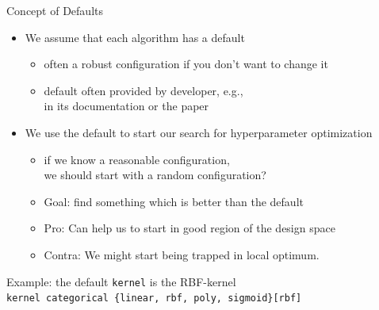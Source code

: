 \begin{frame}[c]{Concept of Defaults}

\begin{itemize}
  \item We assume that each algorithm has a default
  \begin{itemize}
    \item often a robust configuration if you don't want to change it
    \item default often provided by developer, e.g.,\\
   		  in its documentation or the paper
  \end{itemize}
  \pause
  \item We use the default to start our search for hyperparameter optimization
  \begin{itemize}
    \item if we know a reasonable configuration,\\ we should start with a random configuration?
    \item Goal: find something which is better than the default
    \pause
    \smallskip
    \item Pro: Can help us to start in good region of the design space
    \item Contra: We might start being trapped in local optimum.
  \end{itemize}
\end{itemize}

\pause
Example: the default \texttt{kernel} is the RBF-kernel\\
\texttt{kernel categorical \{linear, rbf, poly, sigmoid\}[rbf]}

\end{frame}
